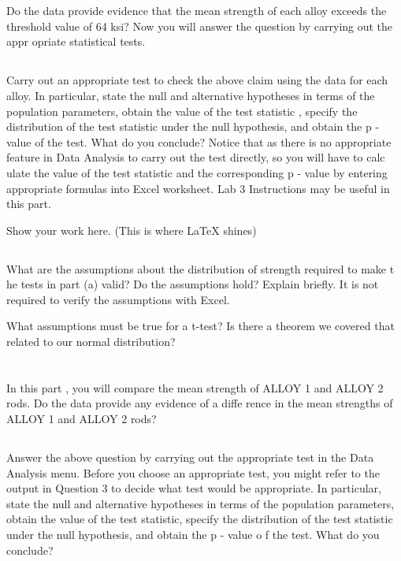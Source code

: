 \documentclass[letterpaper]{article}
\begin{document}
\section{}%
Do the data provide evidence that the mean strength of each alloy exceeds the
threshold value of 64 ksi?  Now you will answer the question by carrying out the
appr opriate statistical tests.
\subsection{}%
Carry out an appropriate test to check the above claim using the data for each
alloy. In particular, state  the null and alternative hypotheses in terms of the
population parameters, obtain the value of the test  statistic , specify the
distribution of the test statistic under the null hypothesis, and obtain the  p
- value of  the test. What do you conclude? Notice that as there is no
appropriate feature in  Data Analysis to  carry out the test directly,  so  you
will have to calc ulate the value of the test statistic and the  corresponding
p - value by entering appropriate formulas into Excel worksheet.  Lab 3
Instructions may  be useful in this part.

Show your work here. (This is where \LaTeX{} shines)

\subsection{}%
What are the assumptions about the distribution of strength required to make t
he tests in part (a) valid?  Do the assumptions hold? Explain briefly. It is not
required to verify the assumptions with Excel.

What assumptions must be true for a t-test? Is there a theorem we covered that
related to our normal distribution?

\section{}%
In this part , you will compare the mean strength of ALLOY 1 and ALLOY 2 rods.
Do the data provide  any evidence of a diffe rence in the mean strengths of
ALLOY 1 and ALLOY 2 rods?

\subsection{}%
Answer the above question by carrying out the appropriate test in the Data
Analysis menu. Before  you choose an appropriate test, you might refer to the
output in Question  3 to decide  what test would be appropriate.  In particular,
state the null and alternative hypotheses in terms of the  population
parameters, obtain the value of the test statistic, specify the distribution of
the test statistic  under the null hypothesis, and obtain the  p - value o f the
test. What do you conclude?
\end{document}
